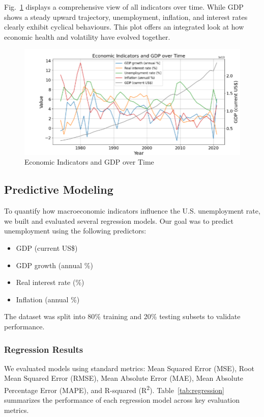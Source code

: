\documentclass[conference]{IEEEtran}
\begin{document}
Fig.~\ref{fig:all_indicators} displays a comprehensive view of all indicators over time. While GDP shows a steady upward trajectory, unemployment, inflation, and interest rates clearly exhibit cyclical behaviours. This plot offers an integrated look at how economic health and volatility have evolved together.

\begin{figure}[htbp]
    \centering
    \includegraphics[width=0.9\linewidth]{all_indicators.png}
    \caption{Economic Indicators and GDP over Time}
    \label{fig:all_indicators}
\end{figure}

\subsection{Predictive Modeling}

To quantify how macroeconomic indicators influence the U.S. unemployment rate, we built and evaluated several regression models. Our goal was to predict unemployment using the following predictors:
\begin{itemize}
    \item GDP (current US\$)
    \item GDP growth (annual \%)
    \item Real interest rate (\%)
    \item Inflation (annual \%)
\end{itemize}

The dataset was split into 80\% training and 20\% testing subsets to validate performance.

\subsubsection*{Regression Results}
We evaluated models using standard metrics: Mean Squared Error (MSE), Root Mean Squared Error (RMSE), Mean Absolute Error (MAE), Mean Absolute Percentage Error (MAPE), and R-squared (R\textsuperscript{2}). Table~\ref{tab:regression} summarizes the performance of each regression model across key evaluation metrics.
\end{document}
